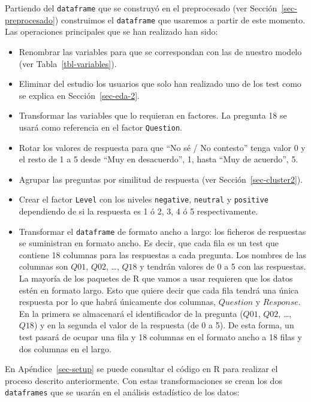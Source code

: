 \documentclass[
  12pt,
  a4paper,
  extrafontsizes,
  onecolumn,
  openright]{memoir}
\providecommand{\tightlist}{%
  \setlength{\itemsep}{0pt}\setlength{\parskip}{0pt}}\usepackage{longtable,booktabs,array}
\begin{document}
\normalsize

Partiendo del \texttt{dataframe} que se construyó en el preprocesado
(ver Sección~\ref{sec-preprocesado}) construimos el \texttt{dataframe}
que usaremos a partir de este momento. Las operaciones principales que
se han realizado han sido:

\begin{itemize}
\tightlist
\item
  Renombrar las variables para que se correspondan con las de nuestro
  modelo (ver Tabla~\ref{tbl-variables}).
\item
  Eliminar del estudio los usuarios que solo han realizado uno de los
  test como se explica en Sección~\ref{sec-eda-2}.
\item
  Transformar las variables que lo requieran en factores. La pregunta 18
  se usará como referencia en el factor \texttt{Question}.
\item
  Rotar los valores de respuesta para que \enquote{No sé / No contesto}
  tenga valor 0 y el resto de 1 a 5 desde \enquote{Muy en desacuerdo},
  1, hasta \enquote{Muy de acuerdo}, 5.
\item
  Agrupar las preguntas por similitud de respuesta (ver
  Sección~\ref{sec-cluster2}).
\item
  Crear el factor \texttt{Level} con los niveles \texttt{negative},
  \texttt{neutral} y \texttt{positive} dependiendo de si la respuesta es
  1 ó 2, 3, 4 ó 5 respectivamente.
\item
  Transformar el \texttt{dataframe} de formato ancho a largo: los
  ficheros de respuestas se suministran en formato ancho. Es decir, que
  cada fila es un test que contiene 18 columnas para las respuestas a
  cada pregunta. Los nombres de las columnas son \(Q01\), \(Q02\),
  \ldots, \(Q18\) y tendrán valores de 0 a 5 con las respuestas. La
  mayoría de los paquetes de R que vamos a usar requieren que los datos
  estén en formato largo. Esto que quiere decir que cada fila tendrá una
  única respuesta por lo que habrá únicamente dos columnas, \(Question\)
  y \(Response\). En la primera se almacenará el identificador de la
  pregunta (\(Q01\), \(Q02\), \ldots, \(Q18\)) y en la segunda el valor
  de la respuesta (de 0 a 5). De esta forma, un test pasará de ocupar
  una fila y 18 columnas en el formato ancho a 18 filas y dos columnas
  en el largo.
\end{itemize}

En Apéndice~\ref{sec-setup} se puede consultar el código en R para
realizar el proceso descrito anteriormente. Con estas transformaciones
se crean los dos \texttt{dataframes} que se usarán en el análisis
estadístico de los datos:
\end{document}
